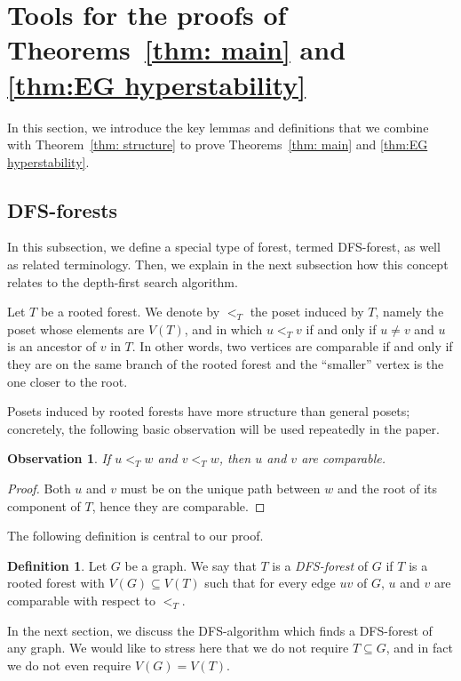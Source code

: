 \documentclass[10pt]{article}
\newtheorem{observation}[theorem]{Observation}
\theoremstyle{definition}
\newtheorem{definition}[theorem]{Definition}
\begin{document}
\section{Tools for the proofs of Theorems~\ref{thm: main} and \ref{thm:EG hyperstability}}\label{sec:preliminaries}

In this section, we introduce the key lemmas and definitions that we combine with Theorem~\ref{thm: structure} to prove Theorems~\ref{thm: main} and \ref{thm:EG hyperstability}.

\subsection{DFS-forests}
    In this subsection, we define a special type of forest, termed DFS-forest, as well as related terminology. Then, we explain in the next subsection how this concept relates to the depth-first search algorithm.
    
    Let $T$ be a rooted forest.  We denote by $<_T$ the poset induced by $T$, namely the poset whose elements are $V(T)$, and in which $u<_T v$ if and only if $u\neq v$ and $u$ is an ancestor of $v$ in $T$. In other words, two vertices are comparable if and only if they are on the same branch of the rooted forest and the ``smaller'' vertex is the one closer to the root.
    
    \par Posets induced by rooted forests have more structure than general posets; concretely, the following basic observation will be used repeatedly in the paper.
    \begin{observation}\label{key observation}
         If $u<_T w$ and $v<_T w$, then $u$ and $v$ are comparable.
    \end{observation}
    \begin{proof}
        Both $u$ and $v$ must be on the unique path between $w$ and the root of its component of $T$, hence they are comparable.
    \end{proof}
    The following definition is central to our proof. 

    \begin{definition}
    Let $G$ be a graph.
        We say that $T$ is a \emph{DFS-forest} of $G$ if $T$ is a rooted forest with $V(G)\subseteq V(T)$ such that for every edge $uv$ of $G$, $u$ and $v$ are comparable with respect to $<_T$.
    \end{definition}
     In the next section, we discuss the DFS-algorithm which finds a DFS-forest of any graph. We would like to stress here that we do not require $T\subseteq G$, and in fact we do not even require $V(G)=V(T)$.
\end{document}
